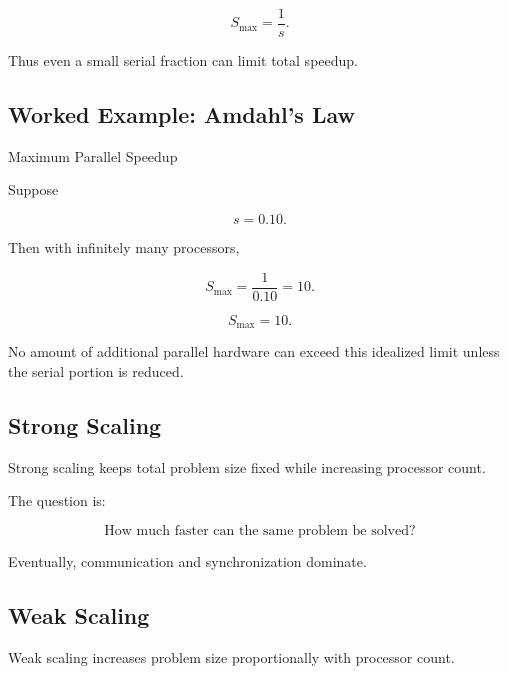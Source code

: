 \[
\boxed{
S_{\max}
=
\frac1s.
}
\]

Thus even a small serial fraction can limit total speedup.

\subsection{Worked Example: Amdahl's Law}
\label{subsec:worked-amdahl}

\begin{workedexamplebox}{Maximum Parallel Speedup}

Suppose

\[
s=0.10.
\]

Then with infinitely many processors,

\[
S_{\max}
=
\frac1{0.10}
=
10.
\]

\begin{answerbox}
\[
\boxed{
S_{\max}=10.
}
\]
\end{answerbox}

No amount of additional parallel hardware can exceed this idealized limit
unless the serial portion is reduced.

\end{workedexamplebox}

\subsection{Strong Scaling}
\label{subsec:strong-scaling}

Strong scaling keeps total problem size fixed while increasing processor
count.

The question is:

\[
\boxed{
\text{How much faster can the same problem be solved?}
}
\]

Eventually, communication and synchronization dominate.

\subsection{Weak Scaling}
\label{subsec:weak-scaling}

Weak scaling increases problem size proportionally with processor count.

